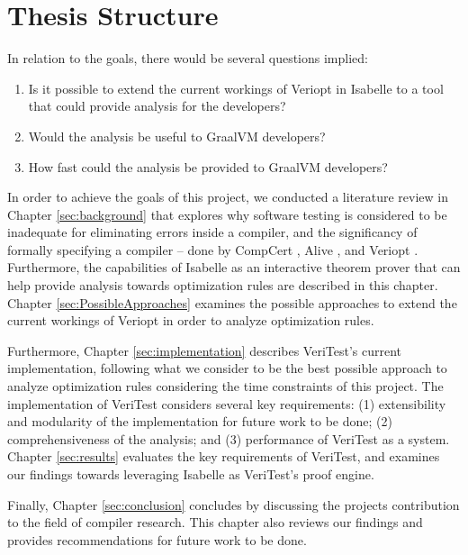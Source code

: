\section{Thesis Structure}

In relation to the goals, there would be several questions implied:

\begin{enumerate}
    \item Is it possible to extend the current workings of Veriopt in Isabelle to a tool that could provide analysis for the developers?    
    \item Would the analysis be useful to GraalVM developers?
    \item How fast could the analysis be provided to GraalVM developers?
\end{enumerate}

In order to achieve the goals of this project, we conducted a literature review in Chapter \ref{sec:background} that explores 
why software testing is considered to be inadequate for eliminating errors inside a compiler, and the significancy of 
formally specifying a compiler -- done by CompCert \cite{compcertVerification}, Alive \cite{AliveInLean, Alive2}, and 
Veriopt \cite{ATVA21_GraalVM_IR_Semantics, Term_Graph_Optimizations}. Furthermore, the capabilities of Isabelle as an interactive 
theorem prover that can help provide analysis towards optimization rules are described in this chapter. Chapter \ref{sec:PossibleApproaches} 
examines the possible approaches to extend the current workings of Veriopt in order to analyze optimization rules.

Furthermore, Chapter \ref{sec:implementation} describes VeriTest's current implementation, following what we consider to be the 
best possible approach to analyze optimization rules considering the time constraints of this project. The implementation of VeriTest 
considers several key requirements: (1) extensibility and modularity of the implementation for future work to be done; (2) comprehensiveness 
of the analysis; and (3) performance of VeriTest as a system. Chapter \ref{sec:results} evaluates the key requirements of VeriTest, 
and examines our findings towards leveraging Isabelle as VeriTest's proof engine.

Finally, Chapter \ref{sec:conclusion} concludes by discussing the projects contribution to the field of compiler research. This chapter also 
reviews our findings and provides recommendations for future work to be done.